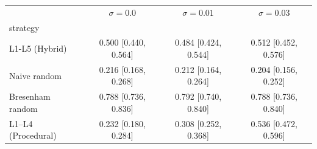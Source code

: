 \begin{tabular}{lccc}
\toprule
 & $\sigma=0.0$ & $\sigma=0.01$ & $\sigma=0.03$ \\
strategy &  &  &  \\
\midrule
L1-L5 (Hybrid) & 0.500 [0.440, 0.564] & 0.484 [0.424, 0.544] & 0.512 [0.452, 0.576] \\
Naive random & 0.216 [0.168, 0.268] & 0.212 [0.164, 0.264] & 0.204 [0.156, 0.252] \\
Bresenham random & 0.788 [0.736, 0.836] & 0.792 [0.740, 0.840] & 0.788 [0.736, 0.840] \\
L1–L4 (Procedural) & 0.232 [0.180, 0.284] & 0.308 [0.252, 0.368] & 0.536 [0.472, 0.596] \\
\bottomrule
\end{tabular}
